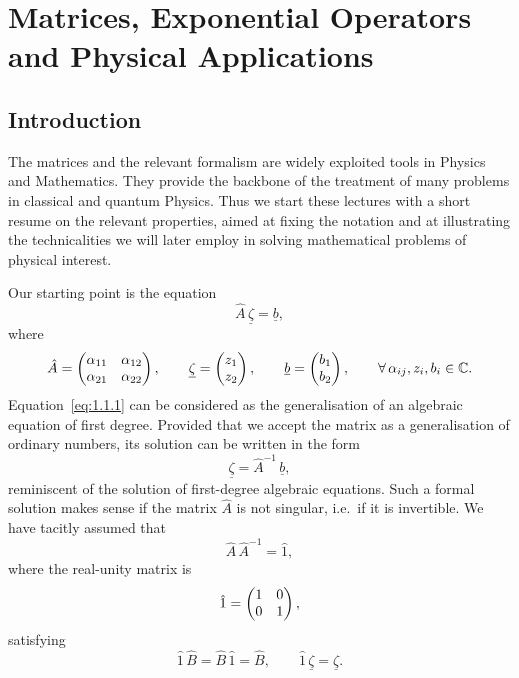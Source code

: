 
\chapter{Matrices, Exponential Operators and Physical Applications}
\label{ch:1}

\section{Introduction}
\label{sec:1.1}

The matrices and the relevant formalism are widely exploited tools in Physics and Mathematics.
They provide the backbone of the treatment of many problems in classical and quantum Physics.
Thus we start these lectures with a short resume on the relevant properties, aimed at fixing the notation and at illustrating the technicalities we will later employ in solving mathematical problems of physical interest.

Our starting point is the equation
\begin{equation}
\hat{A}\,\underline{\zeta} = \underline{b},
\label{eq:1.1.1}
\end{equation}
where
\[
\hat{A} = \begin{pmatrix}\alpha_{11} & \alpha_{12} \\ \alpha_{21} & \alpha_{22}\end{pmatrix},\qquad
\underline{\zeta} = \begin{pmatrix}z_{1} \\ z_{2}\end{pmatrix},\qquad
\underline{b} = \begin{pmatrix}b_{1} \\ b_{2}\end{pmatrix},\qquad
\forall\,\alpha_{ij},z_{i},b_{i}\in\mathbb{C}.
\]
Equation~\eqref{eq:1.1.1} can be considered as the generalisation of an algebraic equation of first degree.
Provided that we accept the matrix as a generalisation of ordinary numbers, its solution can be written in the form
\begin{equation}
\underline{\zeta} = \hat{A}^{-1}\,\underline{b},
\label{eq:1.1.3}
\end{equation}
reminiscent of the solution of first-degree algebraic equations.
Such a formal solution makes sense if the matrix $\hat{A}$ is not singular, i.e.\ if it is invertible.
We have tacitly assumed that
\begin{equation}
\hat{A}\,\hat{A}^{-1} = \hat{1},
\label{eq:1.1.4}
\end{equation}
where the real-unity matrix is
\[
\hat{1} = \begin{pmatrix}1 & 0 \\ 0 & 1\end{pmatrix},
\]
satisfying
\[
\hat{1}\,\hat{B} = \hat{B}\,\hat{1} = \hat{B},\qquad \hat{1}\,\underline{\zeta} = \underline{\zeta}.
\]

